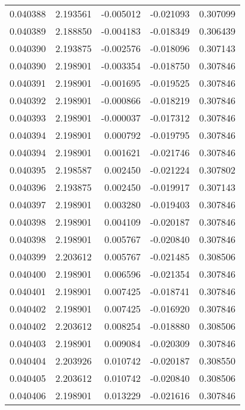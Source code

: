 \begin{tabular}{lrrrr}
0.040388    &  2.193561 & -0.005012 & -0.021093 &             0.307099 \\
0.040389    &  2.188850 & -0.004183 & -0.018349 &             0.306439 \\
0.040390    &  2.193875 & -0.002576 & -0.018096 &             0.307143 \\
0.040390    &  2.198901 & -0.003354 & -0.018750 &             0.307846 \\
0.040391    &  2.198901 & -0.001695 & -0.019525 &             0.307846 \\
0.040392    &  2.198901 & -0.000866 & -0.018219 &             0.307846 \\
0.040393    &  2.198901 & -0.000037 & -0.017312 &             0.307846 \\
0.040394    &  2.198901 &  0.000792 & -0.019795 &             0.307846 \\
0.040394    &  2.198901 &  0.001621 & -0.021746 &             0.307846 \\
0.040395    &  2.198587 &  0.002450 & -0.021224 &             0.307802 \\
0.040396    &  2.193875 &  0.002450 & -0.019917 &             0.307143 \\
0.040397    &  2.198901 &  0.003280 & -0.019403 &             0.307846 \\
0.040398    &  2.198901 &  0.004109 & -0.020187 &             0.307846 \\
0.040398    &  2.198901 &  0.005767 & -0.020840 &             0.307846 \\
0.040399    &  2.203612 &  0.005767 & -0.021485 &             0.308506 \\
0.040400    &  2.198901 &  0.006596 & -0.021354 &             0.307846 \\
0.040401    &  2.198901 &  0.007425 & -0.018741 &             0.307846 \\
0.040402    &  2.198901 &  0.007425 & -0.016920 &             0.307846 \\
0.040402    &  2.203612 &  0.008254 & -0.018880 &             0.308506 \\
0.040403    &  2.198901 &  0.009084 & -0.020309 &             0.307846 \\
0.040404    &  2.203926 &  0.010742 & -0.020187 &             0.308550 \\
0.040405    &  2.203612 &  0.010742 & -0.020840 &             0.308506 \\
0.040406    &  2.198901 &  0.013229 & -0.021616 &             0.307846 \\

\end{tabular}
